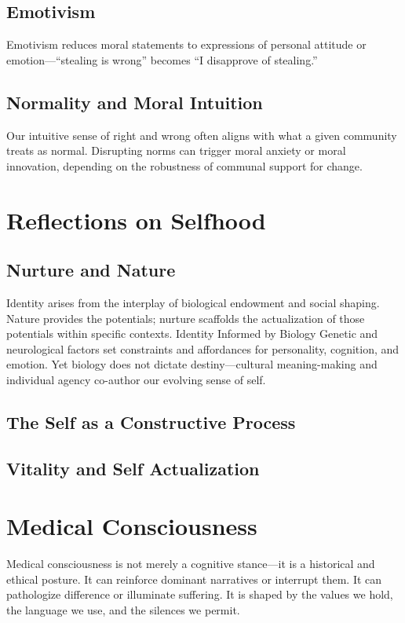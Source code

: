\documentclass[a4paper]{article}
\begin{document}
\subsection{Emotivism}
Emotivism reduces moral statements to expressions of personal attitude or emotion—“stealing is wrong” becomes “I disapprove of stealing.”

\subsection{Normality and Moral Intuition}
Our intuitive sense of right and wrong often aligns with what a given community treats as normal. 
Disrupting norms can trigger moral anxiety or moral innovation, depending on the robustness of communal support for change.

\section{Reflections on Selfhood}
\subsection{Nurture and Nature}
Identity arises from the interplay of biological endowment and social shaping. 
Nature provides the potentials; nurture scaffolds the actualization of those potentials within specific contexts.
Identity Informed by Biology
Genetic and neurological factors set constraints and affordances for personality, cognition, and emotion. 
Yet biology does not dictate destiny—cultural meaning-making and individual agency co-author our evolving sense of self.

\subsection{The Self as a Constructive Process}

\subsection{Vitality and Self Actualization}


\section{Medical Consciousness}
Medical consciousness is not merely a cognitive stance—it is a historical and ethical posture.  
It can reinforce dominant narratives or interrupt them.  
It can pathologize difference or illuminate suffering.  
It is shaped by the values we hold, the language we use, and the silences we permit.
\end{document}
